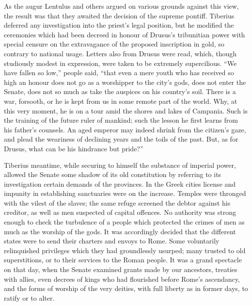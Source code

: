 As the augur Lentulus and others argued on various grounds against this view, the result was that they awaited the decision of the supreme pontiff. Tiberius deferred any investigation into the priest's legal position, but he modified the ceremonies which had been decreed in honour of Drusus's tribunitian power with special censure on the extravagance of the proposed inscription in gold, so contrary to national usage. Letters also from Drusus were read, which, though studiously modest in expression, were taken to be extremely supercilious. ``We have fallen so low,'' people said, ``that even a mere youth who has received so high an honour does not go as a worshipper to the city's gods, does not enter the Senate, does not so much as take the auspices on his country's soil. There is a war, forsooth, or he is kept from us in some remote part of the world. Why, at this very moment, he is on a tour amid the shores and lakes of Campania. Such is the training of the future ruler of mankind; such the lesson he first learns from his father's counsels. An aged emperor may indeed shrink from the citizen's gaze, and plead the weariness of declining years and the toils of the past. But, as for Drusus, what can be his hindrance but pride?''


Tiberius meantime, while securing to himself the substance of imperial power, allowed the Senate some shadow of its old constitution by referring to its investigation certain demands of the provinces. In the Greek cities license and impunity in establishing sanctuaries were on the increase. Temples were thronged with the vilest of the slaves; the same refuge screened the debtor against his creditor, as well as men suspected of capital offences. No authority was strong enough to check the turbulence of a people which protected the crimes of men as much as the worship of the gods. It was accordingly decided that the different states were to send their charters and envoys to Rome. Some voluntarily relinquished privileges which they had groundlessly usurped; many trusted to old superstitions, or to their services to the Roman people. It was a grand spectacle on that day, when the Senate examined grants made by our ancestors, treaties with allies, even decrees of kings who had flourished before Rome's ascendancy, and the forms of worship of the very deities, with full liberty as in former days, to ratify or to alter.


